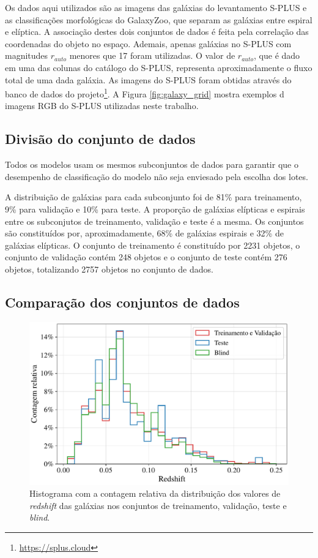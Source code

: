 Os dados aqui utilizados são as imagens das galáxias do levantamento S-PLUS e as classificações morfológicas do GalaxyZoo, que separam as galáxias entre espiral e elíptica. A associação destes dois conjuntos de dados é feita pela correlação das coordenadas do objeto no espaço. Ademais, apenas galáxias no S-PLUS com magnitudes $r_{auto}$ menores que 17 foram utilizadas. O valor de $r_{auto}$, que é dado em uma das colunas do catálogo do S-PLUS, representa aproximadamente o fluxo total de uma dada galáxia.  As imagens do S-PLUS foram obtidas através do banco de dados do projeto\footnote{\url{https://splus.cloud}}. A Figura \ref{fig:galaxy_grid} mostra exemplos d imagens RGB do S-PLUS utilizadas neste trabalho.

\subsection{Divisão do conjunto de dados}
\label{section:divisao_conjunto_de_dados}

Todos os modelos usam os mesmos subconjuntos de dados para garantir que o desempenho de classificação do modelo não seja enviesado pela escolha dos lotes.

A distribuição de galáxias para cada subconjunto foi de 81\% para treinamento, 9\% para validação e 10\% para teste. A proporção de galáxias elípticas e espirais entre os subconjutos de treinamento, validação e teste é a mesma. Os conjuntos são constituídos por, aproximadamente, 68\% de galáxias espirais e 32\% de galáxias elípticas. O conjunto de treinamento é constituído por 2231 objetos, o conjunto de validação contém 248 objetos e o conjunto de teste contém 276 objetos, totalizando 2757 objetos no conjunto de dados.


\subsection{Comparação dos conjuntos de dados}

\begin{figure}[!ht]
  \centering
  \includegraphics[width=0.58\linewidth]{figures/hist_170_redshift.pdf}
  \caption{Histograma com a contagem relativa da distribuição dos valores de \emph{redshift} das galáxias nos conjuntos de treinamento, validação, teste e \emph{blind}.}
  \label{fig:redshift-17}
\end{figure}

